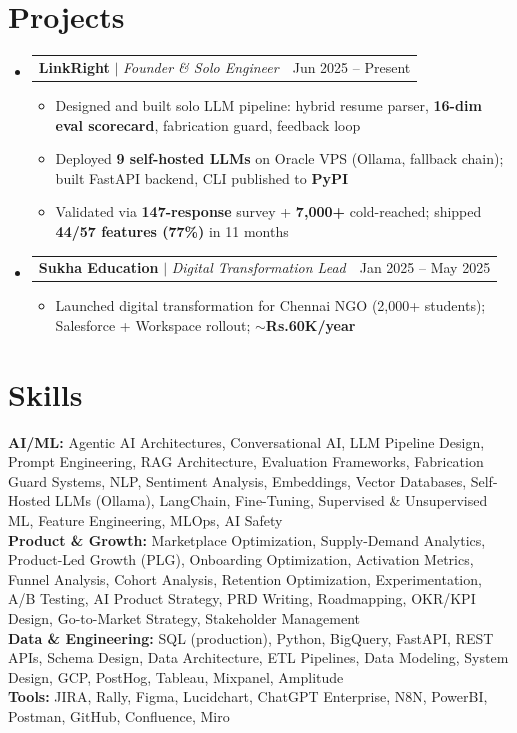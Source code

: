 \documentclass[a4paper,10pt]{article}
\makeatletter
\newcommand{\resumeItem}[1]{
  \item\small{#1\vspace{-2pt}}
}
\newcommand{\resumeProjectHeading}[2]{
  \item
  \begin{tabular*}{0.97\textwidth}{l@{\extracolsep{\fill}}r}
    \small#1 & #2 \\
  \end{tabular*}\vspace{-7pt}
}
\newcommand{\resumeSubHeadingListStart}{\begin{itemize}[leftmargin=0.15in, label={}]}
\newcommand{\resumeSubHeadingListEnd}{\end{itemize}}
\newcommand{\resumeItemListStart}{\begin{itemize}\parfillskip=0pt}
\newcommand{\resumeItemListEnd}{\end{itemize}\vspace{-5pt}}
\makeatother
\begin{document}
\section{Projects}
\resumeSubHeadingListStart

  \resumeProjectHeading
    {\textbf{LinkRight} $|$ \emph{Founder \& Solo Engineer}}{Jun 2025 -- Present}
  \resumeItemListStart
    \resumeItem{Designed and built solo LLM pipeline: hybrid resume parser, \textbf{16-dim eval scorecard}, fabrication guard, feedback loop}
    \resumeItem{Deployed \textbf{9 self-hosted LLMs} on Oracle VPS (Ollama, fallback chain); built FastAPI backend, CLI published to \textbf{PyPI}}
    \resumeItem{Validated via \textbf{147-response} survey + \textbf{7,000+} cold-reached; shipped \textbf{44/57 features (77\%)} in 11 months}
  \resumeItemListEnd

  \resumeProjectHeading
    {\textbf{Sukha Education} $|$ \emph{Digital Transformation Lead}}{Jan 2025 -- May 2025}
  \resumeItemListStart
    \resumeItem{Launched digital transformation for Chennai NGO (2,000+ students); Salesforce + Workspace rollout; \textbf{$\sim$Rs.60K/year}}
  \resumeItemListEnd

\resumeSubHeadingListEnd

\section{Skills}
\begin{itemize}[leftmargin=0.15in, label={}]
  \small{\item{
    \textbf{AI/ML:}{ Agentic AI Architectures, Conversational AI, LLM Pipeline Design, Prompt Engineering, RAG Architecture, Evaluation Frameworks, Fabrication Guard Systems, NLP, Sentiment Analysis, Embeddings, Vector Databases, Self-Hosted LLMs (Ollama), LangChain, Fine-Tuning, Supervised \& Unsupervised ML, Feature Engineering, MLOps, AI Safety} \\
    \textbf{Product \& Growth:}{ Marketplace Optimization, Supply-Demand Analytics, Product-Led Growth (PLG), Onboarding Optimization, Activation Metrics, Funnel Analysis, Cohort Analysis, Retention Optimization, Experimentation, A/B Testing, AI Product Strategy, PRD Writing, Roadmapping, OKR/KPI Design, Go-to-Market Strategy, Stakeholder Management} \\
    \textbf{Data \& Engineering:}{ SQL (production), Python, BigQuery, FastAPI, REST APIs, Schema Design, Data Architecture, ETL Pipelines, Data Modeling, System Design, GCP, PostHog, Tableau, Mixpanel, Amplitude} \\
    \textbf{Tools:}{ JIRA, Rally, Figma, Lucidchart, ChatGPT Enterprise, N8N, PowerBI, Postman, GitHub, Confluence, Miro}
  }}
\end{itemize}
\end{document}
